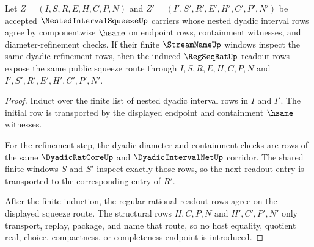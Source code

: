 \begin{theorem}
\label{thm:nested-interval-squeeze-dyadic-refinement-stability}
Let $Z=(I,S,R,E,H,C,P,N)$ and $Z'=(I',S',R',E',H',C',P',N')$ be accepted $\NestedIntervalSqueezeUp$ carriers whose nested dyadic interval rows agree by componentwise $\hsame$ on endpoint rows, containment witnesses, and diameter-refinement checks. If their finite $\StreamNameUp$ windows inspect the same dyadic refinement rows, then the induced $\RegSeqRatUp$ readout rows expose the same public squeeze route through $I,S,R,E,H,C,P,N$ and $I',S',R',E',H',C',P',N'$.
\end{theorem}
\begin{proof}
Induct over the finite list of nested dyadic interval rows in $I$ and $I'$. The initial row is transported by the displayed endpoint and containment $\hsame$ witnesses.

For the refinement step, the dyadic diameter and containment checks are rows of the same $\DyadicRatCoreUp$ and $\DyadicIntervalNetUp$ corridor. The shared finite windows $S$ and $S'$ inspect exactly those rows, so the next readout entry is transported to the corresponding entry of $R'$.

After the finite induction, the regular rational readout rows agree on the displayed squeeze route. The structural rows $H,C,P,N$ and $H',C',P',N'$ only transport, replay, package, and name that route, so no host equality, quotient real, choice, compactness, or completeness endpoint is introduced.
\end{proof}

